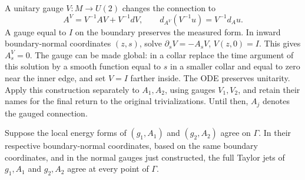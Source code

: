 A unitary gauge \(V:M\to U(2)\) changes the connection to
\begin{equation}\label{bdy:gauge}
 A^V=V^{-1}AV+V^{-1}dV,\qquad
 d_{A^V}(V^{-1}u)=V^{-1}d_Au.
\end{equation}
A gauge equal to \(I\) on the boundary preserves the measured form.
In inward boundary-normal coordinates \((z,s)\), solve
\(\partial_sV=-A_sV\), \(V(z,0)=I\).  This gives \(A^V_s=0\).
The gauge can be made global: in a collar replace the time argument
of this solution by a smooth function equal to \(s\) in a smaller
collar and equal to zero near the inner edge, and set \(V=I\)
farther inside.  The ODE preserves unitarity.  Apply this construction
separately to \(A_1,A_2\), using gauges \(V_1,V_2\), and retain their
names for the final return to the original trivializations.  Until
then, \(A_j\) denotes the gauged connection.

\begin{lemma}\label{bdy:jets}
Suppose the local energy forms of \((g_1,A_1)\) and \((g_2,A_2)\)
agree on \(\Gamma\).  In their respective boundary-normal coordinates,
based on the same boundary coordinates, and in the normal gauges
just constructed, the full Taylor jets of \(g_1,A_1\) and
\(g_2,A_2\) agree at every point of \(\Gamma\).
\end{lemma}

